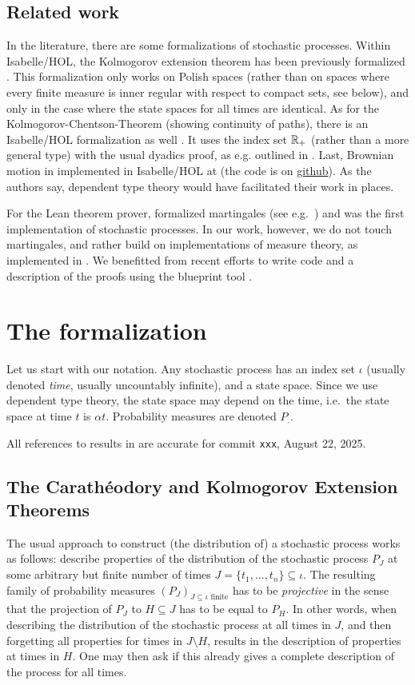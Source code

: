 \documentclass[lean]{AFM}
\begin{document}
\subsection{Related work}
In the literature, there are some formalizations of stochastic processes. Within Isabelle/HOL, the Kolmogorov extension theorem has been previously formalized \cite{Immler2012}. This formalization only works on Polish spaces (rather than on spaces where every finite measure is inner regular with respect to compact sets, see below), and only in the case where the state spaces for all times are identical. As for the Kolmogorov-Chentson-Theorem (showing continuity of paths), there is an Isabelle/HOL formalization as well \cite{Kolmogorov_Chentsov-AFP}. It uses the index set  $\mathbb{R}_+$ (rather than a more general type) with the usual dyadics proof, as e.g. outlined in \cite{kallenberg2021}. Last,
Brownian motion in implemented in Isabelle/HOL at \cite{laursen2024brownian} (the code is on \href{https://github.com/cplaursen/Brownian_Motion}{github}). As the authors say, dependent type theory would have facilitated their work in places.

For the Lean theorem prover, \cite{ying2023formalization} formalized martingales (see e.g.\ \cite{kallenberg2021}) and was the first implementation of stochastic processes. In our work, however, we do not touch martingales, and rather build on implementations of measure theory, as implemented in \cite{mathlib}. We benefitted from recent efforts to write code and a description of the proofs using the blueprint tool \cite{Monticone_LeanProject_2025}.

\section{The formalization}
Let us start with our notation. Any stochastic process has an index set $\iota$ (usually denoted {\em time}, usually uncountably infinite), and a state space. Since we use dependent type theory, the state space may depend on the time, i.e.\ the state space at time $t$ is $\alpha t$. Probability measures are denoted $P_.$.

All references to results in \mathlib are accurate for commit {\tt xxx}, August 22, 2025.

\subsection{The Carathéodory and Kolmogorov Extension Theorems}
The usual approach to construct (the distribution of) a stochastic process works as follows: describe properties of the distribution of the stochastic process $P_J$ at some arbitrary but finite number of times $J = \{t_1,...,t_n\} \subseteq \iota$.
The resulting family of probability measures $(P_J)_{J \subseteq \iota \text{ finite}}$ has to be {\em projective} in the sense that the projection of $P_J$ to $H\subseteq J$ has to be equal to $P_H$. In other words, when describing the distribution of the stochastic process at all times in $J$, and then forgetting all properties for times in $J\setminus H$, results in the description of properties at times in $H$. One may then ask if this already gives a complete description of the process for all times.
\end{document}

